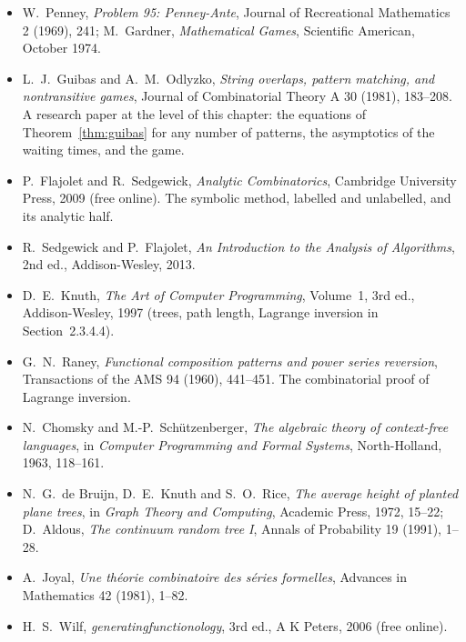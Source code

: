 \begin{itemize}
\item W.~Penney, \emph{Problem 95: Penney-Ante}, Journal of Recreational Mathematics 2 (1969), 241; M.~Gardner, \emph{Mathematical
Games}, Scientific American, October 1974.
\item L.~J.~Guibas and A.~M.~Odlyzko, \emph{String overlaps, pattern matching, and nontransitive games}, Journal of Combinatorial
Theory A 30 (1981), 183--208. A research paper at the level of this chapter: the equations of Theorem~\ref{thm:guibas} for any
number of patterns, the asymptotics of the waiting times, and the game.
\item P.~Flajolet and R.~Sedgewick, \emph{Analytic Combinatorics}, Cambridge University Press, 2009 (free online). The symbolic
method, labelled and unlabelled, and its analytic half.
\item R.~Sedgewick and P.~Flajolet, \emph{An Introduction to the Analysis of Algorithms}, 2nd ed., Addison-Wesley, 2013.
\item D.~E.~Knuth, \emph{The Art of Computer Programming}, Volume~1, 3rd ed., Addison-Wesley, 1997 (trees, path length, Lagrange
inversion in Section~2.3.4.4).
\item G.~N.~Raney, \emph{Functional composition patterns and power series reversion}, Transactions of the AMS 94 (1960),
441--451. The combinatorial proof of Lagrange inversion.
\item N.~Chomsky and M.-P.~Sch\"utzenberger, \emph{The algebraic theory of context-free languages}, in \emph{Computer Programming
and Formal Systems}, North-Holland, 1963, 118--161.
\item N.~G.~de Bruijn, D.~E.~Knuth and S.~O.~Rice, \emph{The average height of planted plane trees}, in \emph{Graph Theory and
Computing}, Academic Press, 1972, 15--22; D.~Aldous, \emph{The continuum random tree I}, Annals of Probability 19 (1991), 1--28.
\item A.~Joyal, \emph{Une th\'eorie combinatoire des s\'eries formelles}, Advances in Mathematics 42 (1981), 1--82.
\item H.~S.~Wilf, \emph{generatingfunctionology}, 3rd ed., A K Peters, 2006 (free online).
\end{itemize}
